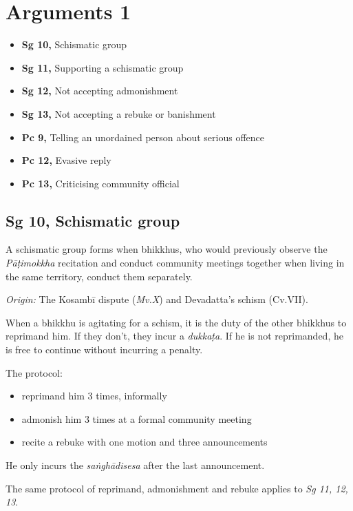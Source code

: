 \chapter{Arguments 1}

\begin{itemize}
\tightlist
\item
  \textbf{Sg 10,} Schismatic group
\item
  \textbf{Sg 11,} Supporting a schismatic group
\item
  \textbf{Sg 12,} Not accepting admonishment
\item
  \textbf{Sg 13,} Not accepting a rebuke or banishment
\item
  \textbf{Pc 9,} Telling an unordained person about serious offence
\item
  \textbf{Pc 12,} Evasive reply
\item
  \textbf{Pc 13,} Criticising community official
\end{itemize}

\section{Sg 10, Schismatic group}

A schismatic group forms when bhikkhus, who would previously observe the
\emph{Pāṭimokkha} recitation and conduct community meetings together
when living in the same territory, conduct them separately.

\emph{Origin:} The Kosambī dispute (\emph{Mv.X}) and Devadatta's schism
(Cv.VII).

When a bhikkhu is agitating for a schism, it is the duty of the other
bhikkhus to reprimand him. If they don't, they incur a \emph{dukkaṭa}.
If he is not reprimanded, he is free to continue without incurring a
penalty.

The protocol:

\begin{itemize}
\tightlist
\item
  reprimand him 3 times, informally
\item
  admonish him 3 times at a formal community meeting
\item
  recite a rebuke with one motion and three announcements
\end{itemize}

He only incurs the \emph{saṅghādisesa} after the last announcement.

The same protocol of reprimand, admonishment and rebuke applies to
\emph{Sg 11, 12, 13}.


